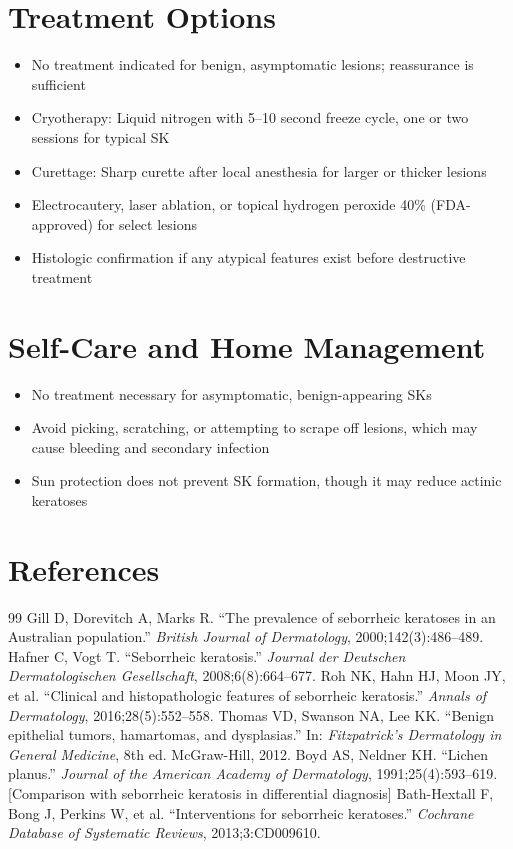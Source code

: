 \section*{Treatment Options}
\begin{itemize}
  \item No treatment indicated for benign, asymptomatic lesions; reassurance is sufficient
  \item Cryotherapy: Liquid nitrogen with 5--10 second freeze cycle, one or two sessions for typical SK
  \item Curettage: Sharp curette after local anesthesia for larger or thicker lesions
  \item Electrocautery, laser ablation, or topical hydrogen peroxide 40\% (FDA-approved) for select lesions
  \item Histologic confirmation if any atypical features exist before destructive treatment
\end{itemize}

\section*{Self-Care and Home Management}
\begin{itemize}
  \item No treatment necessary for asymptomatic, benign-appearing SKs
  \item Avoid picking, scratching, or attempting to scrape off lesions, which may cause bleeding and secondary infection
  \item Sun protection does not prevent SK formation, though it may reduce actinic keratoses
\end{itemize}

\section*{References}
\begin{thebibliography}{99}
 Gill D, Dorevitch A, Marks R. ``The prevalence of seborrheic keratoses in an Australian population.'' \textit{British Journal of Dermatology}, 2000;142(3):486--489.
 Hafner C, Vogt T. ``Seborrheic keratosis.'' \textit{Journal der Deutschen Dermatologischen Gesellschaft}, 2008;6(8):664--677.
 Roh NK, Hahn HJ, Moon JY, et al. ``Clinical and histopathologic features of seborrheic keratosis.'' \textit{Annals of Dermatology}, 2016;28(5):552--558.
 Thomas VD, Swanson NA, Lee KK. ``Benign epithelial tumors, hamartomas, and dysplasias.'' In: \textit{Fitzpatrick's Dermatology in General Medicine}, 8th ed. McGraw-Hill, 2012.
 Boyd AS, Neldner KH. ``Lichen planus.'' \textit{Journal of the American Academy of Dermatology}, 1991;25(4):593--619. [Comparison with seborrheic keratosis in differential diagnosis]
 Bath-Hextall F, Bong J, Perkins W, et al. ``Interventions for seborrheic keratoses.'' \textit{Cochrane Database of Systematic Reviews}, 2013;3:CD009610.
\end{thebibliography}
